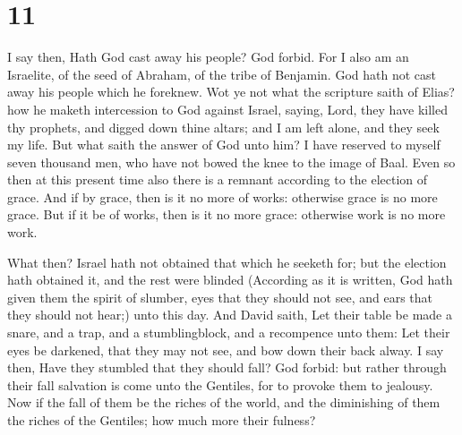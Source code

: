 \hypertarget{section-10}{%
\section{11}\label{section-10}}

 I say then, Hath God cast away his people? God forbid. For
I also am an Israelite, of the seed of Abraham, of the tribe of
Benjamin.  God hath not cast away his people which he
foreknew. Wot ye not what the scripture saith of Elias? how he maketh
intercession to God against Israel, saying,  Lord, they have
killed thy prophets, and digged down thine altars; and I am left alone,
and they seek my life.  But what saith the answer of God
unto him? I have reserved to myself seven thousand men, who have not
bowed the knee to the image of Baal.  Even so then at this
present time also there is a remnant according to the election of grace.
 And if by grace, then is it no more of works: otherwise
grace is no more grace. But if it be of works, then is it no more grace:
otherwise work is no more work.

 What then? Israel hath not obtained that which he seeketh
for; but the election hath obtained it, and the rest were blinded
 (According as it is written, God hath given them the spirit
of slumber, eyes that they should not see, and ears that they should not
hear;) unto this day.  And David saith, Let their table be
made a snare, and a trap, and a stumblingblock, and a recompence unto
them:  Let their eyes be darkened, that they may not see,
and bow down their back alway.  I say then, Have they
stumbled that they should fall? God forbid: but rather through their
fall salvation is come unto the Gentiles, for to provoke them to
jealousy.  Now if the fall of them be the riches of the
world, and the diminishing of them the riches of the Gentiles; how much
more their fulness?

